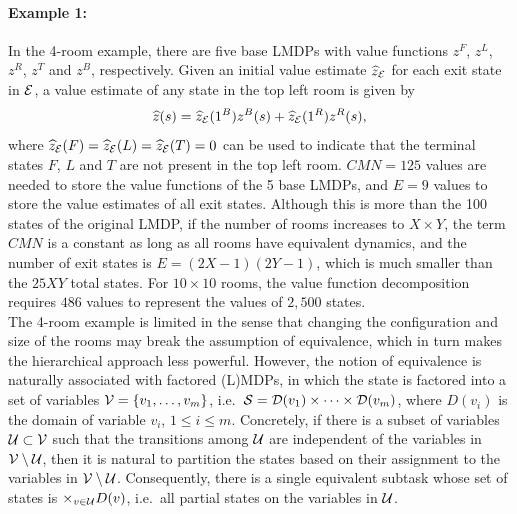 \paragraph{Example 1:} %
In the 4-room example, there are five base LMDPs with value functions $z^F$, $z^L$, $z^R$, $z^T$ and $z^B$, respectively. Given an initial value estimate $\widehat{z}_{\mathcal{E}}$ for each exit state in $\mathcal{E}$, a value estimate of any state in the top left room is given by \[\linebreak\widehat{z}(s)=\widehat{z}_\cE(1^B) z^B(s) + \widehat{z}_\cE(1^R) z^R(s),\] where $\widehat{z}_{\mathcal{E}}(F)=\widehat{z}_{\mathcal{E}}(L)=\widehat{z}_{\mathcal{E}}(T)=0$ can be used to indicate that the terminal states $F$, $L$ and $T$ are not present in the top left room. $CMN = 125$ values are needed to store the value functions of the 5 base LMDPs, and $E=9$ values to store the value estimates of all exit states. Although this is more than the 100 states of the original LMDP, if the number of rooms increases to $X\times Y$, the term $CMN$ is a constant as long as all rooms have equivalent dynamics, and the number of exit states is $E=(2X-1)(2Y-1)$, which is much smaller than the $25 XY$ total states. For $10\times 10$ rooms, the value function decomposition requires $486$ values to represent the values of $2{,}500$ states.\\

The 4-room example is limited in the sense that changing the configuration and size of the rooms may break the assumption of equivalence, which in turn makes the hierarchical approach less powerful. However, the notion of equivalence is naturally associated with factored (L)MDPs, in which the state is factored into a set of variables $\mathcal{V}=\{v_1,\ldots,v_m\}$, i.e.~$\mathcal{S}=\mathcal{D}(v_1)\times\cdots\times\mathcal{D}(v_m)$, where $D(v_i)$ is the domain of variable $v_i$, $1\leq i\leq m$.
Concretely, if there is a subset of variables $\mathcal{U}\subset\mathcal{V}$ such that the transitions among $\mathcal{U}$ are independent of the variables in $\mathcal{V}\setminus\mathcal{U}$, then it is natural to partition the states based on their assignment to the variables in $\mathcal{V}\setminus\mathcal{U}$. Consequently, there is a single equivalent subtask whose set of states is $\times_{v\in\mathcal{U}}D(v)$, i.e.~all partial states on the variables in $\mathcal{U}$.



